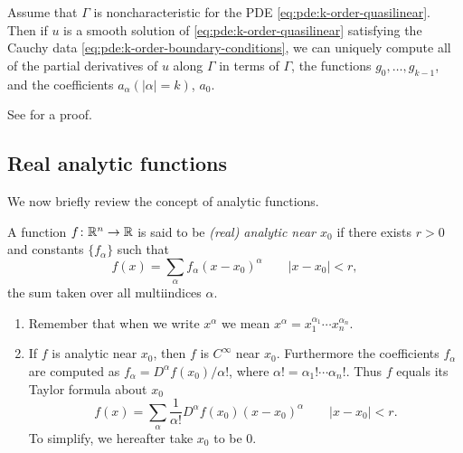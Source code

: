 \begin{theorem}
  Assume that \(\Gamma\) is noncharacteristic for the PDE
  \eqref{eq:pde:k-order-quasilinear}. Then if \(u\) is a smooth solution of
  \eqref{eq:pde:k-order-quasilinear} satisfying the Cauchy data
  \eqref{eq:pde:k-order-boundary-conditions}, we can uniquely compute all
  of the partial derivatives of \(u\) along \(\Gamma\) in terms of
  \(\Gamma\), the functions \(g_0,\dotsc,g_{k-1}\), and the coefficients
  \(a_\alpha(|\alpha|=k)\), \(a_0\).
\end{theorem}

See \cite[\S 4.6.b]{evans} for a proof.

\subsection{Real analytic functions}
We now briefly review the concept of analytic functions.
\begin{definition}
  A function \(f\colon\mathbb{R}^n\to\mathbb{R}\) is said to be \emph{(real) analytic
    near \(x_0\)} if there exists \(r>0\) and constants \(\{f_\alpha\}\)
  such that
  \[
    f(x)=\sum_\alpha f_\alpha(x-x_0)^\alpha\qquad |x-x_0|<r,
  \]
  the sum taken over all multiindices \(\alpha\).
\end{definition}

\begin{remarks}
  \hfill
  \begin{enumerate}[label=(\roman*),noitemsep]
  \item Remember that when we write \(x^\alpha\) we mean
    \(x^\alpha=x_1^{\alpha_1}\dotsm x_n^{\alpha_n}\).
  \item If \(f\) is analytic near \(x_0\), then \(f\) is \(C^\infty\) near
    \(x_0\). Furthermore the coefficients \(f_\alpha\) are computed as
    \(f_\alpha=D^\alpha f(x_0)/\alpha!\), where \(\alpha!=\alpha_1!\dotsm
    \alpha_n!\). Thus \(f\) equals its Taylor formula about \(x_0\)
    \[
      f(x)
      =\sum_{\alpha}\frac{1}{\alpha!} D^\alpha f(x_0)(x-x_0)^\alpha\qquad
      |x-x_0|<r.
    \]
    To simplify, we hereafter take \(x_0\) to be \(0\).
  \end{enumerate}
\end{remarks}

